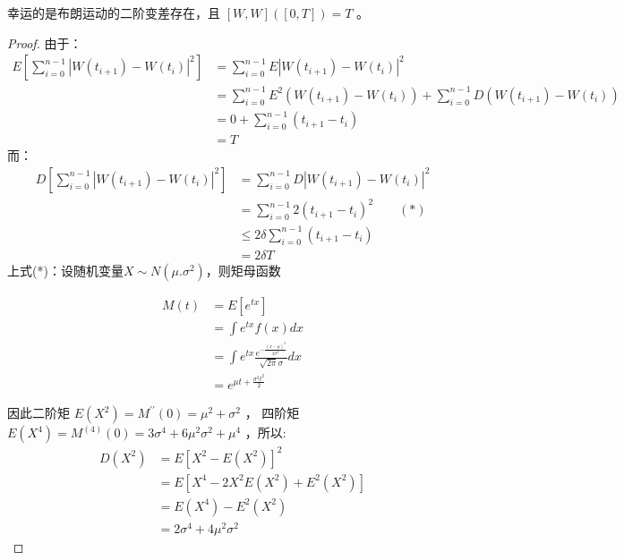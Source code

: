 幸运的是布朗运动的二阶变差存在，且 $[W, W]([0, T])=T$ 。
\begin{proof}
  由于：
  \begin{equation}
    \begin{aligned}
      E\left[\sum_{i=0}^{n-1}\left|W\left(t_{i+1}\right)-W\left(t_i\right)\right|^2\right] & =\sum_{i=0}^{n-1} E\left|W\left(t_{i+1}\right)-W\left(t_i\right)\right|^2 \\
      & =\sum_{i=0}^{n-1} E^2\left(W\left(t_{i+1}\right)-W\left(t_i\right)\right)+\sum_{i=0}^{n-1} D\left(W\left(t_{i+1}\right)-W\left(t_i\right)\right) \\
      & =0+\sum_{i=0}^{n-1}\left(t_{i+1}-t_i\right) \\
      & =T
    \end{aligned}
  \end{equation}
  而：
  \begin{equation}
  \begin{aligned}
    D\left[\sum_{i=0}^{n-1}\left|W\left(t_{i+1}\right)-W\left(t_i\right)\right|^2\right] & =\sum_{i=0}^{n-1} D\left|W\left(t_{i+1}\right)-W\left(t_i\right)\right|^2 \\
    & =\sum_{i=0}^{n-1} 2\left(t_{i+1}-t_i\right)^2  \qquad(*)\\
    & \leq 2 \delta \sum_{i=0}^{n-1}\left(t_{i+1}-t_i\right) \\
    & =2 \delta T
  \end{aligned}
\end{equation}
上式(*)：设随机变量$X \sim N(\mu. \sigma^2)$，则矩母函数

$$
\begin{aligned}
M(t) & =E\left[e^{t x}\right] \\
& =\int e^{t x} f(x) d x \\
& =\int e^{t x} \frac{e^{-\frac{(x-\mu)^2}{2\sigma^2}}}{\sqrt{2 \pi} \sigma} d x \\
& =e^{\mu t+\frac{\sigma^2 t^2}{2}}
\end{aligned}
$$

因此二阶矩 $E\left(X^2\right)=M^{\prime \prime}(0)=\mu^2+\sigma^2$ ，
四阶矩 $E\left(X^4\right)=M^{(4)}(0)=3\sigma^4+6\mu^2\sigma^2+\mu^4$ ，所以:
$$
\begin{aligned}
D\left(X^2\right) & =E\left[X^2-E\left(X^2\right)\right]^2 \\
& =E\left[X^4-2 X^2 E\left(X^2\right)+E^2\left(X^2\right)\right] \\
& =E\left(X^4\right)-E^2\left(X^2\right) \\
& =2\sigma^4+4\mu^2\sigma^2
\end{aligned}
$$


\end{proof}
